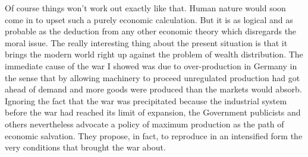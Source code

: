 \documentclass{book}
\begin{document}
Of course things won’t work out exactly like that. Human nature would soon come in to upset such a purely economic calculation. But it is as logical and as probable as the deduction from any other economic theory which disregards the moral issue. The really interesting thing about the present situation is that it brings the modern world right up against the problem of wealth distribution. The immediate cause of the war I showed was due to over-production in Germany in the sense that by allowing machinery to proceed unregulated production had got ahead of demand and more goods were produced than the markets would absorb. Ignoring the fact that the war was precipitated because the industrial system before the war had reached its limit of expansion, the Government publicists and others nevertheless advocate a policy of maximum production as the path of economic salvation. They propose, in fact, to reproduce in an intensified form the very conditions that brought the war about.
\end{document}
